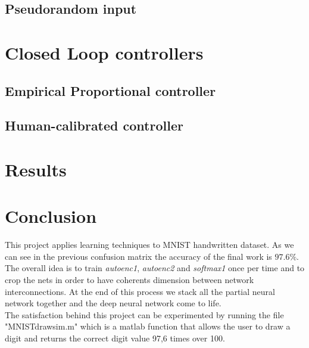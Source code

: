 \section{Pseudorandom input}

\chapter{Closed Loop controllers}
\section{Empirical Proportional controller}
\section{Human-calibrated controller}
\chapter{Results}

\chapter*{Conclusion}
This project applies learning \cite{art:rif.1} techniques to MNIST handwritten dataset. As we can see in the previous confusion matrix the accuracy of the final work is $97.6\%$. The overall idea is to train \emph{autoenc1},  \emph{autoenc2} and \emph{softmax1} once per time and to crop the nets in order to have coherents dimension between network interconnections. At the end of \cite{book:rif.2}this process we stack all the partial neural network together and the deep neural network come to life. \\The satisfaction behind this project can be experimented by running the file "MNIST\textunderscore drawsim.m" which is a matlab function that allows the user to draw a digit and returns the correct digit value 97,6 times over 100.
